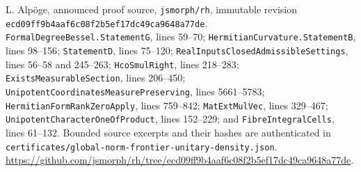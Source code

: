 L. Alp\"oge, announced proof source, \texttt{jsmorph/rh}, immutable
revision \texttt{ecd09ff9b4aaf6c08f2b5ef17dc49ca9648a77de}.
\texttt{FormalDegreeBessel.StatementG}, lines 59--70;
\texttt{HermitianCurvature.StatementB}, lines 98--156;
\texttt{StatementD}, lines 75--120;
\texttt{RealInputsClosedAdmissibleSettings}, lines 56--58 and 245--263;
\texttt{HcoSmulRight}, lines 218--283;
\texttt{ExistsMeasurableSection}, lines 206--450;
\texttt{UnipotentCoordinatesMeasurePreserving}, lines 5661--5783;
\texttt{HermitianFormRankZeroApply}, lines 759--842;
\texttt{MatExtMulVec}, lines 329--467;
\texttt{UnipotentCharacterOneOfProduct}, lines 152--229;
and \texttt{FibreIntegralCells}, lines 61--132.
Bounded source excerpts and their hashes are authenticated in
\texttt{certificates/global-norm-frontier-unitary-density.json}.
\url{https://github.com/jsmorph/rh/tree/ecd09ff9b4aaf6c08f2b5ef17dc49ca9648a77de}.
